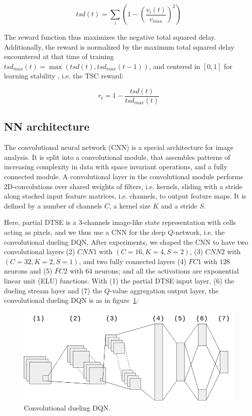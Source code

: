 \documentclass[journal]{IEEEtran}
\begin{document}
\[ tsd(t) = \sum_{i} (1 - (\frac{v_i(t)}{v_{max}})^2) \]

The reward function thus maximizes the negative total squared delay. Additionally, the reward is normalized by the maximum total squared delay encountered at that time of training $tsd_{max}(t) = \max (tsd(t), tsd_{max}(t-1))$, and centered in $[0, 1]$ for learning stability \cite{genders2019opensource}, i.e. the TSC reward:

\[ r_t = 1 - \frac{tsd(t)}{tsd_{max}(t)} \]

\subsection{NN architecture}

The convolutional neural network (CNN) \cite{krizhevsky2012imagenet} is a special architecture for image analysis. It is split into a convolutional module, that assembles patterns of increasing complexity in data with space invariant operations, and a fully connected module. A convolutional layer in the convolutional module performs 2D-convolutions over shared weights of filters, i.e. kernels, sliding with a stride along stacked input feature matrices, i.e. channels, to output feature maps. It is defined by a number of channels $C$, a kernel size $K$ and a stride $S$.

Here, partial DTSE is a 3-channels image-like state representation with cells acting as pixels, and we thus use a CNN for the deep $Q$-network, i.e. the convolutional dueling DQN. After experiments, we shaped the CNN to have two convolutional layers (2) $CNN1$ with $(C=16,K=4,S=2)$, (3) $CNN2$ with $(C=32,K=2,S=1)$, and two fully connected layers (4) $FC1$ with $128$ neurons and (5) $FC2$ with $64$ neurons; and all the activations are exponential linear unit (ELU) functions. With (1) the partial DTSE input layer, (6) the dueling stream layer and (7) the $Q$-value aggregation output layer, the convolutional dueling DQN is as in figure~\ref{fig:cnn_dueling}:

\begin{figure}[htbp]
  \begin{center}
    \includegraphics[width=1\linewidth,keepaspectratio]{img/model/cnn_dueling.png}  
    \caption{Convolutional dueling DQN.}
    \label{fig:cnn_dueling}
  \end{center}
\end{figure}
\end{document}
